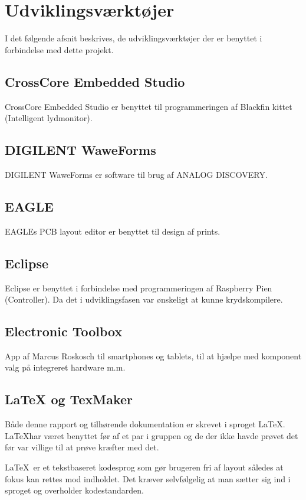 \chapter{Udviklingsværktøjer}
I det følgende afsnit beskrives, de  udviklingsværktøjer der er benyttet i forbindelse med dette projekt. 

\section*{CrossCore Embedded Studio}
CrossCore Embedded Studio er benyttet til programmeringen af Blackfin kittet (Intelligent lydmonitor).

\section*{DIGILENT WaweForms}
DIGILENT WaweForms er software til brug af ANALOG DISCOVERY.

\section*{EAGLE}
EAGLEs PCB layout editor er benyttet til design af prints.

\section*{Eclipse}
Eclipse er benyttet i forbindelse med programmeringen af Raspberry Pien (Controller). Da det i udviklingsfasen var ønskeligt at kunne krydskompilere. 

\section*{Electronic Toolbox}
App af Marcus Roskosch til smartphones og tablets, til at hjælpe med komponent valg på integreret hardware m.m.

\section*{LaTeX og TexMaker}
Både denne rapport og tilhørende dokumentation er skrevet i sproget \LaTeX. \LaTeX har været benyttet før af et par i gruppen og de der ikke havde prøvet det før var villige til at prøve kræfter med det.

\LaTeX \ er et tekstbaseret kodesprog som gør brugeren fri af layout således at fokus kan rettes mod indholdet. Det kræver selvfølgelig at man sætter sig ind i sproget og overholder kodestandarden. 


